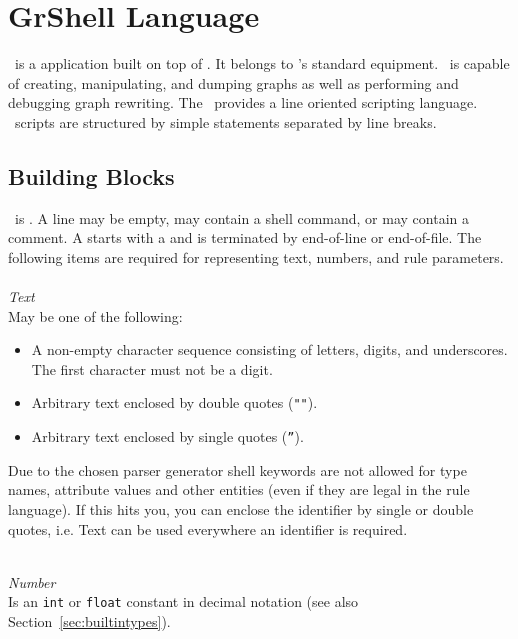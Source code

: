 \chapter{GrShell Language}
\label{chapgrshell}
\GrShell\ is a  application built on top of \LibGr{}. 
It belongs to \GrG's standard equipment. 
\GrShell\ is capable of creating, manipulating, and dumping graphs as well as performing and debugging graph rewriting.
The \GrShell\ provides a line oriented scripting language. 
\GrShell\ scripts are structured by simple statements separated by line breaks.



\section{Building Blocks}

\GrShell\ is . 
A line may be empty, may contain a shell command, or may contain a comment. 
A  starts with a \indexed{\texttt{\#}} and is terminated by end-of-line or end-of-file. 
The following items are required for representing text, numbers, and rule parameters.\\
\\
\emph{Text}\\
May be one of the following:
\begin{itemize}
  \item A non-empty character sequence consisting of letters, digits, and underscores. The first character must not be a digit.
  \item Arbitrary text enclosed by double quotes (\texttt{""}).
  \item Arbitrary text enclosed by single quotes (\texttt{''}).
\end{itemize}
Due to the chosen parser generator shell keywords are not allowed for type names, attribute values and other entities (even if they are legal in the rule language). If this hits you, you can enclose the identifier by single or double quotes, i.e. Text can be used everywhere an identifier is required.

\mbox{ }\\
\emph{Number}\\
Is an \texttt{int} or \texttt{float} constant in decimal notation (see also Section~\ref{sec:builtintypes}).

